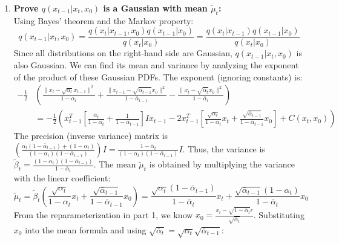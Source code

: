\documentclass{article}
\begin{document}
{\begin{enumerate}
        \item \textbf{Prove $q(x_{t-1}|x_t, x_0)$ is a Gaussian with mean $\tilde{\mu}_t$:} \\
        Using Bayes' theorem and the Markov property:
        \begin{equation*}
            q(x_{t-1}|x_t, x_0) = \frac{q(x_t|x_{t-1}, x_0) q(x_{t-1}|x_0)}{q(x_t|x_0)} = \frac{q(x_t|x_{t-1}) q(x_{t-1}|x_0)}{q(x_t|x_0)}
        \end{equation*}
        Since all distributions on the right-hand side are Gaussian, $q(x_{t-1}|x_t, x_0)$ is also Gaussian. We can find its mean and variance by analyzing the exponent of the product of these Gaussian PDFs. The exponent (ignoring constants) is:
        \begin{align*}
            -\frac{1}{2} &\left( \frac{\|x_t - \sqrt{\alpha_t} x_{t-1}\|^2}{1 - \alpha_t} + \frac{\|x_{t-1} - \sqrt{\bar{\alpha}_{t-1}} x_0\|^2}{1 - \bar{\alpha}_{t-1}} - \frac{\|x_t - \sqrt{\bar{\alpha}_t} x_0\|^2}{1 - \bar{\alpha}_t} \right) \\
            &= -\frac{1}{2} \left( x_{t-1}^T \left[ \frac{\alpha_t}{1 - \alpha_t} + \frac{1}{1 - \bar{\alpha}_{t-1}} \right] I x_{t-1} - 2 x_{t-1}^T \left[ \frac{\sqrt{\alpha_t}}{1 - \alpha_t} x_t + \frac{\sqrt{\bar{\alpha}_{t-1}}}{1 - \bar{\alpha}_{t-1}} x_0 \right] + C(x_t, x_0) \right)
        \end{align*}
        The precision (inverse variance) matrix is $\left( \frac{\alpha_t(1 - \bar{\alpha}_{t-1}) + (1 - \alpha_t)}{(1 - \alpha_t)(1 - \bar{\alpha}_{t-1})} \right) I = \frac{1 - \bar{\alpha}_t}{(1 - \alpha_t)(1 - \bar{\alpha}_{t-1})} I$.
        Thus, the variance is $\tilde{\beta}_t = \frac{(1 - \alpha_t)(1 - \bar{\alpha}_{t-1})}{1 - \bar{\alpha}_t}$.
        The mean $\tilde{\mu}_t$ is obtained by multiplying the variance with the linear coefficient:
        \begin{equation*}
            \tilde{\mu}_t = \tilde{\beta}_t \left( \frac{\sqrt{\alpha_t}}{1 - \alpha_t} x_t + \frac{\sqrt{\bar{\alpha}_{t-1}}}{1 - \bar{\alpha}_{t-1}} x_0 \right) = \frac{\sqrt{\alpha_t}(1 - \bar{\alpha}_{t-1})}{1 - \bar{\alpha}_t} x_t + \frac{\sqrt{\bar{\alpha}_{t-1}}(1 - \alpha_t)}{1 - \bar{\alpha}_t} x_0
        \end{equation*}
        From the reparameterization in part 1, we know $x_0 = \frac{x_t - \sqrt{1 - \bar{\alpha}_t}\epsilon}{\sqrt{\bar{\alpha}_t}}$. Substituting $x_0$ into the mean formula and using $\sqrt{\bar{\alpha}_t} = \sqrt{\alpha_t} \sqrt{\bar{\alpha}_{t-1}}$:
        \begin{align*}

\end{align*}
\end{enumerate}}
\end{document}
